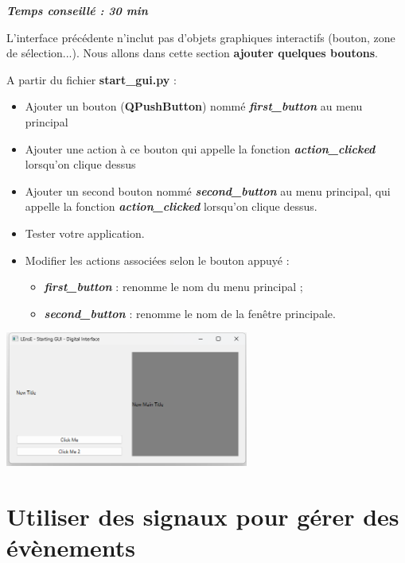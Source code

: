 \documentclass[a4paper,11pt,titlepage]{article} %
\begin{document}
\begin{center} \textbf{\textit{Temps conseillé : 30 min}} \end{center}

L'interface précédente n'inclut pas d'objets graphiques interactifs (bouton, zone de sélection...). Nous allons dans cette section \textbf{ajouter quelques boutons}.

A partir du fichier \textbf{start\_gui.py} :

\begin{itemize}
	\item Ajouter un bouton (\textbf{QPushButton}) nommé \textsl{\textbf{first\_button}} au menu principal
	\item Ajouter une action à ce bouton qui appelle la fonction \textsl{\textbf{action\_clicked}} lorsqu'on clique dessus
	\item Ajouter un second bouton nommé \textsl{\textbf{second\_button}} au menu principal, qui appelle la fonction \textsl{\textbf{action\_clicked}} lorsqu'on clique dessus.
	\item Tester votre application.
	
	\medskip	
	
	\item Modifier les actions associées selon le bouton appuyé :
	\begin{itemize}
		\item \textsl{\textbf{first\_button}} : renomme le nom du menu principal ;
		\item \textsl{\textbf{second\_button}} : renomme le nom de la fenêtre principale.
	\end{itemize}
\end{itemize}

\bigskip

\begin{center}
	\includegraphics[width=0.6\textwidth]{images/start_gui_corr.png}
\end{center}


\newpage
\section{Utiliser des signaux pour gérer des évènements}
\end{document}
